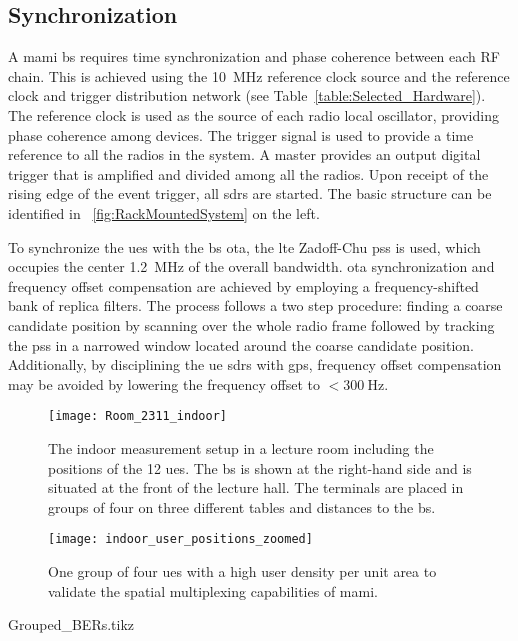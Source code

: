 \documentclass[journal]{IEEEtran}
\begin{document}
\subsection{Synchronization}
A \gls{mami} \gls{bs} requires time synchronization and phase coherence between each RF chain.
This is achieved using the \SI{10}{\mega\hertz} reference clock source and the reference clock and trigger distribution network (see Table~\ref{table:Selected_Hardware}).
The reference clock is used as the source of each radio local oscillator, providing phase coherence among devices.
The trigger signal is used to provide a time reference to all the radios in the system. 
%
%
A master provides an output digital trigger that is amplified and divided among all the radios.
Upon receipt of the rising edge of the event trigger, all \glspl{sdr} are started.
The basic structure can be identified in \figurename~\ref{fig:RackMountedSystem} on the left.

To synchronize the \glspl{ue} with the \gls{bs} \gls{ota}, the \gls{lte} Zadoff-Chu \gls{pss} is used, which occupies the center \SI{1.2}{\mega\hertz} of the overall bandwidth.
\gls{ota} synchronization and frequency offset compensation are achieved by employing a frequency-shifted bank of replica filters.
The process follows a two step procedure: finding a coarse candidate position by scanning over the whole radio frame followed by tracking the \gls{pss} in a narrowed window located around the coarse candidate position.
Additionally, by disciplining the \gls{ue} \glspl{sdr} with \gls{gps}, frequency offset compensation may be avoided by lowering the frequency offset to $<\SI{300}{\hertz}$.

\begin{figure}[!t]
	\centering
	\texttt{[image: Room\_2311\_indoor]}
	\caption{The indoor measurement setup in a lecture room including the positions of the 12 \glspl{ue}. The \gls{bs} is shown at the right-hand side and is situated at the front of the lecture hall. The terminals are placed in groups of four on three different tables and distances to the \gls{bs}.}
	\label{fig:room2311}
\end{figure} 
\begin{figure}[!t]
	\centering
	\texttt{[image: indoor\_user\_positions\_zoomed]}
	\caption{One group of four \glspl{ue} with a high user density per unit area to validate the spatial multiplexing capabilities of \gls{mami}.}
	\label{fig:indoor_UE_group}
\end{figure} 
\begin{figure*}[!t]
	\centering
	  {Grouped_BERs.tikz}%
	\caption{UL and DL \glspl{ber} for 12 \glspl{ue} with \gls{zf} decoder/precoder.}
	\label{fig:BERs}
\end{figure*} 
\end{document}
